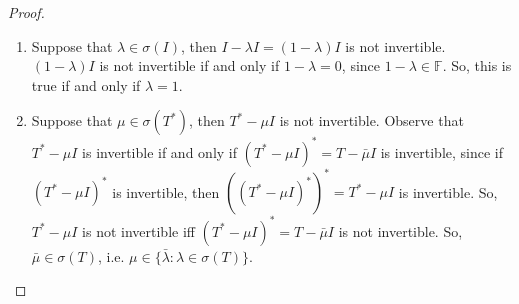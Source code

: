 \documentclass{report}
\begin{document}
\begin{proof}
  \begin{enumerate}
    \item Suppose that $\lambda\in\sigma(I)$, then $I-\lambda I=(1-\lambda)I$ is not invertible. $(1-\lambda)I$ is not invertible if and only if $1-\lambda=0$, since $1-\lambda\in\mathbb{F}$. So, this is true if and only if $\lambda=1$.

    \item Suppose that $\mu\in\sigma(T^{*})$, then $T^{*}-\mu I$ is not invertible. Observe that $T^{*}-\mu I$ is invertible if and only if $(T^{*}-\mu I)^{*}=T-\bar{\mu}I$ is invertible, since if $(T^{*}-\mu I)^{*}$ is invertible, then $((T^{*}-\mu I)^{*})^{*}=T^{*}-\mu I$ is invertible. So, $T^{*}-\mu I$ is not invertible iff $(T^{*}-\mu I)^{*}=T-\bar{\mu}I$ is not invertible. So, $\bar{\mu}\in\sigma(T)$, i.e. $\mu\in\{\bar{\lambda}: \lambda\in\sigma(T)\}$.


\end{enumerate}
\end{proof}
\end{document}
